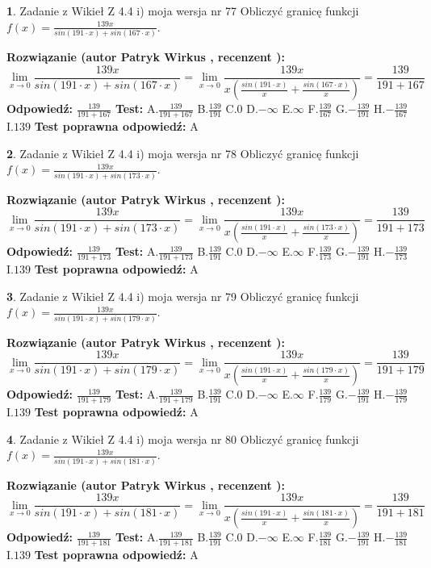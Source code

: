 \documentclass[12pt, a4paper]{article}
\theoremstyle{definition} %
\newtheorem{zad}{}
\newcommand{\zadStart}[1]{\begin{zad}#1\newline}
\newcommand{\zadStop}{\end{zad}}
\newcommand{\rozwStart}[2]{\noindent \textbf{Rozwiązanie (autor #1 , recenzent #2): }\newline}
\newcommand{\rozwStop}{\newline}
\newcommand{\odpStart}{\noindent \textbf{Odpowiedź:}\newline}
\newcommand{\odpStop}{\newline}
\newcommand{\testStart}{\noindent \textbf{Test:}\newline}
\newcommand{\testStop}{\newline}
\newcommand{\kluczStart}{\noindent \textbf{Test poprawna odpowiedź:}\newline}
\newcommand{\kluczStop}{\newline}
\begin{document}
\zadStart{Zadanie z Wikieł Z 4.4 i) moja wersja nr 77}
Obliczyć granicę funkcji $f(x)=\frac{139x}{sin(191\cdot x) +sin(167\cdot x)}$.
\zadStop
\rozwStart{Patryk Wirkus}{}
$$\lim\limits_{x\to 0}\frac{139x}{sin(191\cdot x) +sin(167\cdot x)}=\lim\limits_{x\to 0}\frac{139x}{x(\frac{sin(191\cdot x)}{x}+\frac{sin(167\cdot x)}{x})}=\frac{139}{191+167}$$
\rozwStop
\odpStart
$\frac{139}{191+167}$
\odpStop
\testStart
A.$\frac{139}{191+167}$
B.$\frac{139}{191}$
C.$0$
D.$-\infty$
E.$\infty$
F.$\frac{139}{167}$
G.$-\frac{139}{191}$
H.$-\frac{139}{167}$
I.$139$
\testStop
\kluczStart
A
\kluczStop



\zadStart{Zadanie z Wikieł Z 4.4 i) moja wersja nr 78}
Obliczyć granicę funkcji $f(x)=\frac{139x}{sin(191\cdot x) +sin(173\cdot x)}$.
\zadStop
\rozwStart{Patryk Wirkus}{}
$$\lim\limits_{x\to 0}\frac{139x}{sin(191\cdot x) +sin(173\cdot x)}=\lim\limits_{x\to 0}\frac{139x}{x(\frac{sin(191\cdot x)}{x}+\frac{sin(173\cdot x)}{x})}=\frac{139}{191+173}$$
\rozwStop
\odpStart
$\frac{139}{191+173}$
\odpStop
\testStart
A.$\frac{139}{191+173}$
B.$\frac{139}{191}$
C.$0$
D.$-\infty$
E.$\infty$
F.$\frac{139}{173}$
G.$-\frac{139}{191}$
H.$-\frac{139}{173}$
I.$139$
\testStop
\kluczStart
A
\kluczStop



\zadStart{Zadanie z Wikieł Z 4.4 i) moja wersja nr 79}
Obliczyć granicę funkcji $f(x)=\frac{139x}{sin(191\cdot x) +sin(179\cdot x)}$.
\zadStop
\rozwStart{Patryk Wirkus}{}
$$\lim\limits_{x\to 0}\frac{139x}{sin(191\cdot x) +sin(179\cdot x)}=\lim\limits_{x\to 0}\frac{139x}{x(\frac{sin(191\cdot x)}{x}+\frac{sin(179\cdot x)}{x})}=\frac{139}{191+179}$$
\rozwStop
\odpStart
$\frac{139}{191+179}$
\odpStop
\testStart
A.$\frac{139}{191+179}$
B.$\frac{139}{191}$
C.$0$
D.$-\infty$
E.$\infty$
F.$\frac{139}{179}$
G.$-\frac{139}{191}$
H.$-\frac{139}{179}$
I.$139$
\testStop
\kluczStart
A
\kluczStop



\zadStart{Zadanie z Wikieł Z 4.4 i) moja wersja nr 80}
Obliczyć granicę funkcji $f(x)=\frac{139x}{sin(191\cdot x) +sin(181\cdot x)}$.
\zadStop
\rozwStart{Patryk Wirkus}{}
$$\lim\limits_{x\to 0}\frac{139x}{sin(191\cdot x) +sin(181\cdot x)}=\lim\limits_{x\to 0}\frac{139x}{x(\frac{sin(191\cdot x)}{x}+\frac{sin(181\cdot x)}{x})}=\frac{139}{191+181}$$
\rozwStop
\odpStart
$\frac{139}{191+181}$
\odpStop
\testStart
A.$\frac{139}{191+181}$
B.$\frac{139}{191}$
C.$0$
D.$-\infty$
E.$\infty$
F.$\frac{139}{181}$
G.$-\frac{139}{191}$
H.$-\frac{139}{181}$
I.$139$
\testStop
\kluczStart
A
\kluczStop
\end{document}
